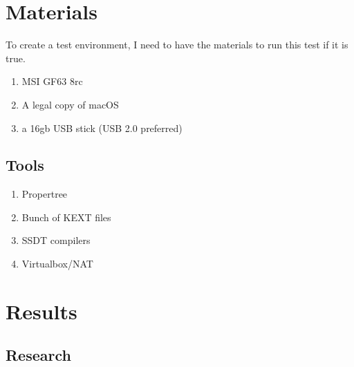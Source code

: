 \documentclass[12pt, letterpaper]{article}
\begin{document}
\section{Materials}
To create a test environment, I need to have the materials to run this test if it is true.
\begin{enumerate}[label=(\roman*)]
    \item MSI GF63 8rc
    \item A legal copy of macOS
    \item a 16gb USB stick (USB 2.0 preferred)
\end{enumerate}
\subsection{Tools}
\begin{enumerate}
    \item Propertree 
    \item Bunch of KEXT files
    \item SSDT compilers
    \item Virtualbox/NAT
\end{enumerate}

\section{Results}


\subsection{Research}
\end{document}
